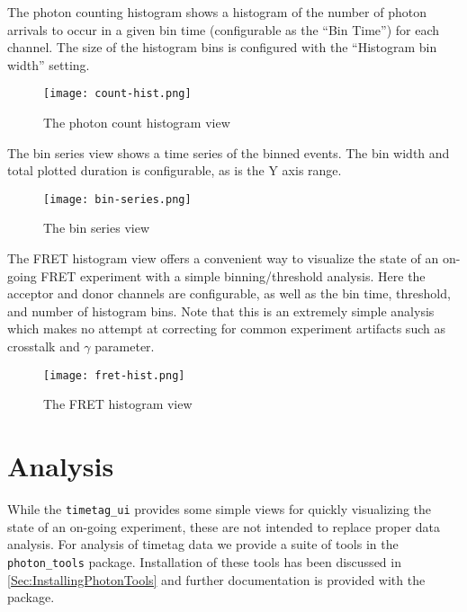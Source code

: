 The photon counting histogram shows a histogram of the number of
photon arrivals to occur in a given bin time (configurable as the
``Bin Time'') for each channel. The size of the histogram bins is
configured with the ``Histogram bin width'' setting.

\begin{figure}
  \center
  \texttt{[image: count-hist.png]}
  \caption{The photon count histogram view}
  \label{Fig:CountHist}
\end{figure}

The bin series view shows a time series of the binned events. The bin
width and total plotted duration is configurable, as is the Y axis
range.

\begin{figure}
  \center
  \texttt{[image: bin-series.png]}
  \caption{The bin series view}
  \label{Fig:BinSeries}
\end{figure}

The FRET histogram view offers a convenient way to visualize the state
of an on-going FRET experiment with a simple binning/threshold
analysis. Here the acceptor and donor channels are configurable, as
well as the bin time, threshold, and number of histogram bins. Note
that this is an extremely simple analysis which makes no attempt at
correcting for common experiment artifacts such as crosstalk and
$\gamma$ parameter.

\begin{figure}
  \center
  \texttt{[image: fret-hist.png]}
  \caption{The FRET histogram view}
  \label{Fig:FretHist}
\end{figure}


\section{Analysis}

While the {\tt timetag\_ui} provides some simple views for quickly
visualizing the state of an on-going experiment, these are not
intended to replace proper data analysis. For analysis of timetag data
we provide a suite of tools in the {\tt photon\_tools}
package. Installation of these tools has been discussed in
\ref{Sec:InstallingPhotonTools} and further documentation is provided
with the package.
